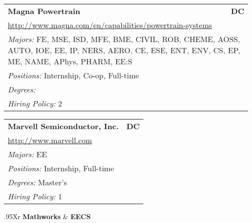 \documentclass[twoside]{article}
\begin{document}
\begin{center}
\begin{multicols}{3}
\begin{FlushLeft}
\begin{minipage}{\columnwidth}\begin{tabularx}{.95\columnwidth}{Xr}
                 {\Large\bf Magna Powertrain} & {\Large\bf DC}\\
    \multicolumn{2}{p{.95\columnwidth}}{\url{http://www.magna.com/en/capabilities/powertrain-systems}}\\
    \multicolumn{2}{p{.95\columnwidth}}{\emph{Majors:} FE, MSE, ISD, MFE, BME, CIVIL, ROB, CHEME, AOSS, AUTO, IOE, EE, IP, NERS, AERO, CE, ESE, ENT, ENV, CS, EP, ME, NAME, APhys, PHARM, EE:S}\\
    \multicolumn{2}{p{.95\columnwidth}}{\emph{Positions:} Internship, Co-op, Full-time}\\
    \multicolumn{2}{p{.95\columnwidth}}{\emph{Degrees:} }\\
    \multicolumn{2}{p{.95\columnwidth}}{\emph{Hiring Policy:} 2}\\
    \end{tabularx}
    
\end{minipage}
 
\begin{minipage}{\columnwidth}\begin{tabularx}{.95\columnwidth}{Xr}
                 {\Large\bf Marvell Semiconductor, Inc.} & {\Large\bf DC}\\
    \multicolumn{2}{p{.95\columnwidth}}{\url{http://www.marvell.com}}\\
    \multicolumn{2}{p{.95\columnwidth}}{\emph{Majors:} EE}\\
    \multicolumn{2}{p{.95\columnwidth}}{\emph{Positions:} Internship, Full-time}\\
    \multicolumn{2}{p{.95\columnwidth}}{\emph{Degrees:} Master's}\\
    \multicolumn{2}{p{.95\columnwidth}}{\emph{Hiring Policy:} 1}\\
    \end{tabularx}
    
\end{minipage}
 
\begin{minipage}{\columnwidth}\begin{tabularx}{.95\columnwidth}{Xr}
                 {\Large\bf Mathworks} & {\Large\bf EECS}\\
    \\
    \\
    \\
    \\
    \\
    \end{tabularx}
    

\end{minipage}
\end{FlushLeft}
\end{multicols}
\end{center}
\end{document}
